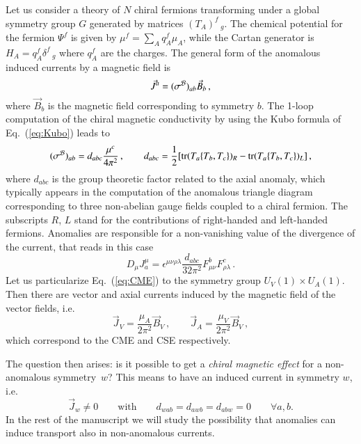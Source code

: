 \documentclass[epj]{webofc}
\newcommand{\tr}{{\textrm{tr}}}
\begin{document}
Let us consider a theory of $N$ chiral fermions transforming under a global symmetry group $G$ generated by matrices $(T_A)^f\,{}_g$. The chemical potential for the fermion $\Psi^f$ is given by $\mu^f= \sum_A q_A^f \mu_A$, while the Cartan generator is $H_A = q^f_A \delta^f\,{}_g$ where $q^f_A$ are the charges. The general form of the anomalous induced currents by a magnetic field is
\begin{equation}
\vec{J}^a  = (\sigma^{\cal B})_{ab}  \vec{B}_b \,, \label{eq:CME}
\end{equation}
where $\vec{B}_b$ is the magnetic field corresponding to symmetry $b$. The 1-loop computation of the chiral magnetic conductivity by using the Kubo formula of Eq.~(\ref{eq:Kubo}) leads to~\cite{Kharzeev:2009pj,Landsteiner:2011cp,Chowdhury:2015pba}
\begin{equation}
(\sigma^\cB)_{ab} = d_{abc} \frac{\mu^c}{4\pi^2}  \,, \qquad  d_{abc} = \frac 1 2 [ \tr( T_a \{ T_b, T_c\} )_R -  \tr( T_a \{ T_b, T_c\} )_L ] \,,
\end{equation}
where $d_{abc}$ is the group theoretic factor related to the axial anomaly, which typically appears in the computation of the anomalous triangle diagram corresponding to three non-abelian gauge fields coupled to a chiral fermion. The subscripts $R$, $L$ stand for the contributions of right-handed and left-handed fermions. Anomalies are responsible for a non-vanishing value of the divergence of the current, that reads in this case~\cite{Kumura:1969wj}
\begin{equation}
D_\mu J_a^\mu= \epsilon^{\mu\nu\rho\lambda} \frac{d_{abc}}{32\pi^2} F^b_{\mu\nu} F^c_{\rho\lambda}    \,.
\end{equation}
Let us particularize Eq.~(\ref{eq:CME}) to the symmetry group $U_V(1) \times U_A(1)$. Then there are vector and axial currents induced by the magnetic field of the vector fields, i.e.
\begin{equation}
\vec{J}_V = \frac{\mu_A}{2\pi^2} \vec{B}_V  \,, \qquad \vec{J}_A = \frac{\mu_V}{2\pi^2} \vec{B}_V  \,, \label{eq:CMECSE}
\end{equation}
which correspond to the CME and CSE respectively. 

The question then arises: is it possible to get a {\it chiral magnetic effect} for a non-anomalous symmetry~$w$? This means to have an induced current in symmetry $w$, i.e.
\begin{equation}
\vec{J}_w \ne 0 \qquad \textrm{with} \qquad    d_{wab} = d_{awb} = d_{abw} = 0 \qquad \forall a,b.
\end{equation}
In the rest of the manuscript we will study the possibility that anomalies can induce transport also in non-anomalous currents.
\end{document}
